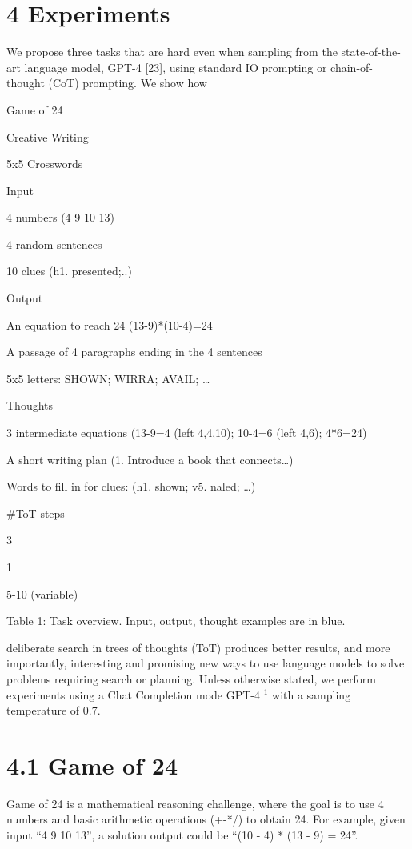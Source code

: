 \documentclass[
]{article}
\begin{document}
\section{4 Experiments}\label{experiments}

We propose three tasks that are hard even when sampling from the
state-of-the-art language model, GPT-4 {[}23{]}, using standard IO
prompting or chain-of-thought (CoT) prompting. We show how

Game of 24

Creative Writing

5x5 Crosswords

Input

4 numbers (4 9 10 13)

4 random sentences

10 clues (h1. presented;..)

Output

An equation to reach 24 (13-9)*(10-4)=24

A passage of 4 paragraphs ending in the 4 sentences

5x5 letters: SHOWN; WIRRA; AVAIL; \ldots{}

Thoughts

3 intermediate equations (13-9=4 (left 4,4,10); 10-4=6 (left 4,6);
4*6=24)

A short writing plan (1. Introduce a book that connects\ldots)

Words to fill in for clues: (h1. shown; v5. naled; \ldots)

\#ToT steps

3

1

5-10 (variable)

Table 1: Task overview. Input, output, thought examples are in blue.

deliberate search in trees of thoughts (ToT) produces better results,
and more importantly, interesting and promising new ways to use language
models to solve problems requiring search or planning. Unless otherwise
stated, we perform experiments using a Chat Completion mode GPT-4
\(^{1}\) with a sampling temperature of 0.7.

\section{4.1 Game of 24}\label{game-of-24}

Game of 24 is a mathematical reasoning challenge, where the goal is to
use 4 numbers and basic arithmetic operations (+-*/) to obtain 24. For
example, given input ``4 9 10 13'', a solution output could be ``(10 -
4) * (13 - 9) = 24''.
\end{document}
